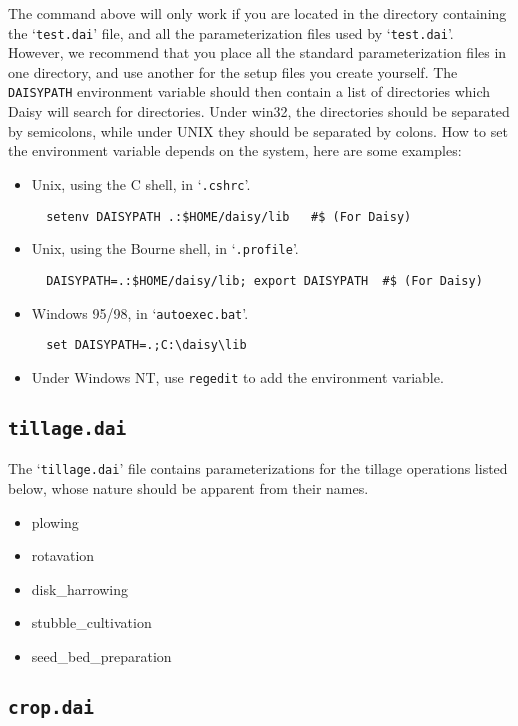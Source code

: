 The command above will only work if you are located in the directory
containing the `\texttt{test.dai}' file, and all the parameterization
files used by `\texttt{test.dai}'.  However, we recommend that you
place all the standard parameterization files in one directory, and
use another for the setup files you create yourself.  The
\texttt{DAISYPATH} environment variable should then contain a list of
directories which Daisy will search for directories.  Under win32, the
directories should be separated by semicolons, while under UNIX they
should be separated by colons.  How to set the environment variable
depends on the system, here are some examples:
\begin{itemize}
\item Unix, using the C shell, in `\texttt{.cshrc}'.
\begin{verbatim}
  setenv DAISYPATH .:$HOME/daisy/lib   #$ (For Daisy)
\end{verbatim}
\item Unix, using the Bourne shell, in `\texttt{.profile}'.
\begin{verbatim}
  DAISYPATH=.:$HOME/daisy/lib; export DAISYPATH  #$ (For Daisy)
\end{verbatim}
\item Windows 95/98, in `\texttt{autoexec.bat}'.
\begin{verbatim}
  set DAISYPATH=.;C:\daisy\lib
\end{verbatim}
\item Under Windows NT, use \texttt{regedit} to add the environment
  variable. 
\end{itemize}

\subsection{\texttt{tillage.dai}}

The `\texttt{tillage.dai}' file contains parameterizations for the
tillage operations listed below, whose nature should be apparent from
their names.
\begin{itemize}
\item plowing
\item rotavation
\item disk\_harrowing
\item stubble\_cultivation
\item seed\_bed\_preparation
\end{itemize}

\subsection{\texttt{crop.dai}}

